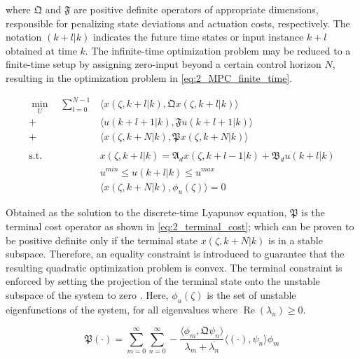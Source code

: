 where $\mathfrak{Q}$ and $\mathfrak{F}$ are positive definite operators of appropriate dimensions, responsible for penalizing state deviations and actuation costs, respectively. The notation $(k+l|k)$ indicates the future time states or input instance $k+l$ obtained at time $k$. The infinite-time optimization problem may be reduced to a finite-time setup by assigning zero-input beyond a certain control horizon $N$, resulting in the optimization problem in \eqref{eq:2_MPC_finite_time}.

\begin{equation} \label{eq:2_MPC_finite_time}
    \begin{aligned}
        \min_{U} \quad \sum_{l=0}^{N-1} &\langle {x}(\zeta, k+l | k), \mathfrak{Q} {x}(\zeta, k+l | k) \rangle \\
        + &\langle u(k+l+1 | k), \mathfrak{F} u(k+l+1|k) \rangle \\
        + &\langle {x}(\zeta, k+N | k), \mathfrak{P} {x}(\zeta, k+N | k) \rangle \\
        \, \\
        \text{s.t.} \quad &{x}(\zeta, k+l | k) = \mathfrak{A}_d {x}(\zeta, k+l-1 | k) + \mathfrak{B}_d u(k+l | k) \\
        &u^{min} \leq u(k+l | k) \leq u^{max} \\
        & \langle {x}(\zeta, k+N | k), {\phi_u}(\zeta) \rangle = 0
    \end{aligned}
\end{equation}

Obtained as the solution to the discrete-time Lyapunov equation, $\mathfrak{P}$ is the terminal cost operator as shown in \eqref{eq:2_terminal_cost}; which can be proven to be positive definite only if the terminal state ${x}(\zeta, k+N | k)$ is in a stable subspace. Therefore, an equality constraint is introduced to guarantee that the resulting quadratic optimization problem is convex. The terminal constraint is enforced by setting the projection of the terminal state onto the unstable subspace of the system to zero \cite{Curtain2020Introduction, xu2017linear,Khatibi2021Model}. Here, ${\phi_u}(\zeta)$ is the set of unstable eigenfunctions of the system, for all eigenvalues where $\operatorname{Re}(\lambda_u) \geq 0$.

\begin{equation} \label{eq:2_terminal_cost}
    \mathfrak{P} (\cdot) = \sum_{m=0}^{\infty} \sum_{n=0}^{\infty} 
    -\frac{
        \langle {\phi_m} , \mathfrak{Q} {\psi_n} \rangle
    }{
        \lambda_m + \overline{\lambda_n}
    }
    \langle (\cdot) , {\psi_n} \rangle \phi_m
\end{equation}

